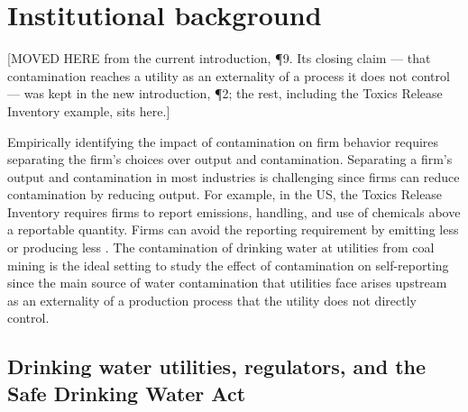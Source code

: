 \documentclass[12pt]{article}
\newcommand{\moved}[1]{%
  \par\nobreak\vspace{0.35em}%
  {\footnotesize\sffamily\color{movedcol}\raggedright #1\par}%
  \nobreak\vspace{-0.35em}\nobreak}
\begin{document}
\onehalfspacing
\clearpage
\section{Institutional background}\label{sec:background}

\moved{[MOVED HERE from the current introduction, \P9. Its closing claim --- that
contamination reaches a utility as an externality of a process it does not control ---
was kept in the new introduction, \P2; the rest, including the Toxics Release Inventory
example, sits here.]}
Empirically identifying the impact of contamination on firm behavior requires separating the firm's choices over output and contamination. Separating a firm's output and contamination in most industries is challenging since firms can reduce contamination by reducing output. For example, in the US, the Toxics Release Inventory requires firms to report emissions, handling, and use of chemicals above a reportable quantity. Firms can avoid the reporting requirement by emitting less or producing less \parencite{zou2021unwatched, 10.1162/rest_a_01477}. The contamination of drinking water at utilities from coal mining is the ideal setting to study the effect of contamination on self-reporting since the main source of water contamination that utilities face arises upstream as an externality of a production process that the utility does not directly control.

\subsection{Drinking water utilities, regulators, and the Safe Drinking Water Act}
\end{document}
